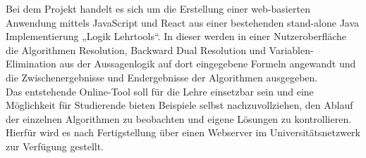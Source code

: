 Bei dem Projekt handelt es sich um die Erstellung einer web-basierten Anwendung mittels JavaScript und React aus einer bestehenden stand-alone Java Implementierung „Logik Lehrtools“. In dieser werden in einer Nutzeroberfläche die Algorithmen Resolution, Backward Dual Resolution und Variablen-Elimination aus der Aussagenlogik auf dort eingegebene Formeln angewandt und die Zwischenergebnisse und Endergebnisse der Algorithmen ausgegeben. \\
Das entstehende Online-Tool soll für die Lehre einsetzbar sein und eine Möglichkeit für Studierende bieten Beispiele selbst nachzuvollziehen, den Ablauf der einzelnen Algorithmen zu beobachten und eigene Lösungen zu kontrollieren. Hierfür wird es nach Fertigstellung über einen Webserver im Universitätsnetzwerk zur Verfügung gestellt. 


